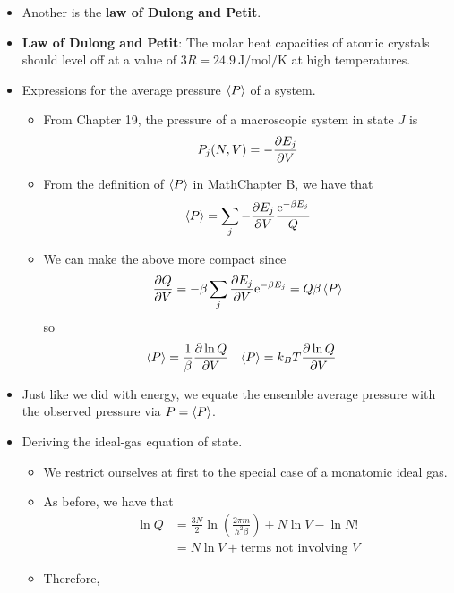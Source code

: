 \documentclass[../notes.tex]{subfiles}
\begin{document}
\begin{itemize}
    \item Another is the \textbf{law of Dulong and Petit}.
    \item \textbf{Law of Dulong and Petit}: The molar heat capacities of atomic crystals should level off at a value of $3R=\SI{24.9}{\joule\per\mole\per\kelvin}$ at high temperatures.
    \item Expressions for the average pressure $\prb{P}$ of a system.
    \begin{itemize}
        \item From Chapter 19, the pressure of a macroscopic system in state $J$ is
        \begin{equation*}
            P_j(N,V) = -\pdv{E_j}{V}
        \end{equation*}
        \item From the definition of $\prb{P}$ in MathChapter B, we have that
        \begin{equation*}
            \prb{P} = \sum_j-\pdv{E_j}{V}\frac{\e[-\beta E_j]}{Q}
        \end{equation*}
        \item We can make the above more compact since
        \begin{equation*}
            \pdv{Q}{V} = -\beta\sum_j\pdv{E_j}{V}\e[-\beta E_j] = Q\beta\prb{P}
        \end{equation*}
        so
        \begin{align*}
            \prb{P} &= \frac{1}{\beta}\pdv{\ln Q}{V}&
            \prb{P} &= k_BT\pdv{\ln Q}{V}
        \end{align*}
    \end{itemize}
    \item Just like we did with energy, we equate the ensemble average pressure with the observed pressure via $P=\prb{P}$.
    \item Deriving the ideal-gas equation of state.
    \begin{itemize}
        \item We restrict ourselves at first to the special case of a monatomic ideal gas.
        \item As before, we have that
        \begin{align*}
            \ln Q &= \frac{3N}{2}\ln\left( \frac{2\pi m}{h^2\beta} \right)+N\ln V-\ln N!\\
            &= N\ln V+\text{terms not involving }V
        \end{align*}
        \item Therefore,
        \begin{align*}

\end{align*}
\end{itemize}
\end{itemize}
\end{document}
